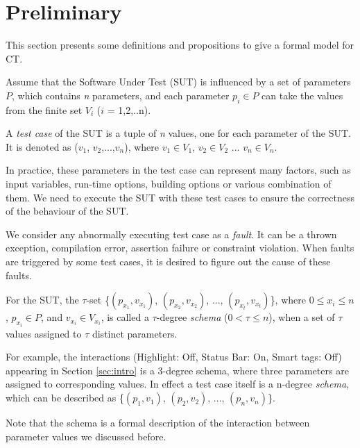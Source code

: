 \documentclass{sig-alternate-05-2015}
\begin{document}
\section{Preliminary}\label{sec:back}
This section presents some definitions and propositions to give a formal model for CT.


Assume that the Software Under Test (SUT) is influenced by a set of parameters $P$, which contains \emph{n} parameters, and each parameter $p_{i} \in P$ can take the values from the finite set $V_{i}$ ($i$ = 1,2,..n).

\newtheorem{assumption}{Assumption}
\newtheorem{proposition}{Proposition}

\begin{definition}\label{de:testcase}
A \emph{test case} of the SUT is a tuple of \emph{n} values, one for each parameter of the SUT. It is denoted as  ($v_{1}$, $v_{2}$,...,$v_{n}$), where $v_{1}\in V_{1}$, $v_{2} \in V_{2}$ ... $v_{n} \in V_{n}$.
\end{definition}

In practice, these parameters in the test case can represent many factors, such as input variables, run-time options, building options or various combination of them. We need to execute the SUT with these test cases to ensure the correctness of the behaviour of the SUT.

We consider any abnormally executing test case as a \emph{fault}. It can be a thrown exception, compilation error, assertion failure or constraint violation. When faults are triggered by some test cases, it is desired to figure out the cause of these faults.


\begin{definition}\label{de:schema}
For the SUT, the $\tau$-set \{$(p_{x_{1}}, v_{x_{1}})$, $(p_{x_{2}}, v_{x_{2}})$, ..., $(p_{x_{t}}, v_{x_{t}})$\}, where $0 \leq x_{i} \leq n$, $p_{x_{i}} \in P$, and $v_{x_{i}} \in V_{x_{i}}$, is called a $\tau$-degree \emph{schema} ($0 < \tau \leq n $), when a set of $\tau$ values assigned to $\tau$ distinct parameters.

For example, the interactions (Highlight: Off, Status Bar: On, Smart tags: Off) appearing in Section \ref{sec:intro} is a 3-degree schema, where three parameters are assigned to corresponding values. In effect a test case itself is a n-degree \emph{schema}, which can be described as \{$(p_{1}, v_{1})$, $(p_{2}, v_{2})$, ..., $(p_{n}, v_{n})$\}.
\end{definition}
Note that the schema is a formal description of the interaction between parameter values we discussed before.
\end{document}
